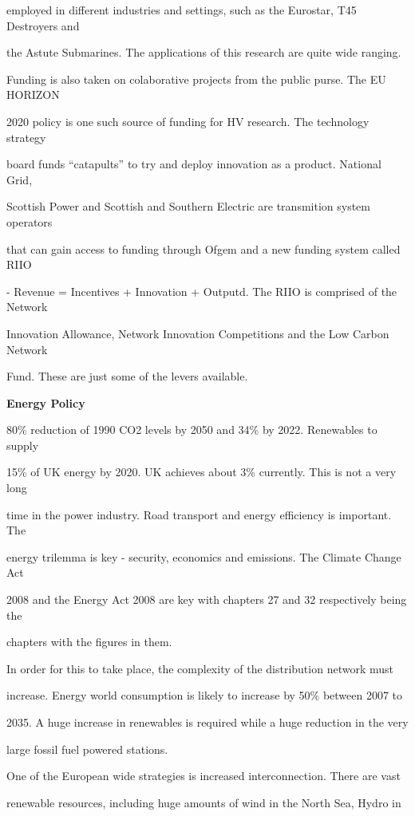employed in different industries and settings, such as the Eurostar, T45 Destroyers and 

the Astute Submarines. The applications of this research are quite wide ranging.

Funding is also taken on colaborative projects from the public purse. The EU HORIZON 

2020 policy is one such source of funding for HV research. The technology strategy 

board funds ``catapults'' to try and deploy innovation as a product. National Grid, 

Scottish Power and Scottish and Southern Electric are transmition system operators 

that can gain access to funding through Ofgem and a new funding system called RIIO 

- Revenue = Incentives + Innovation + Outputd. The RIIO is comprised of the Network 

Innovation Allowance, Network Innovation Competitions and the Low Carbon Network 

Fund. These are just some of the levers available.

\textbf{Energy Policy}

80\% reduction of 1990 CO2 levels by 2050 and 34\% by 2022. Renewables to supply 

15\% of UK energy by 2020. UK achieves about 3\% currently. This is not a very long 

time in the power industry. Road transport and energy efficiency is important. The 

energy trilemma is key - security, economics and emissions. The Climate Change Act 

2008 and the Energy Act 2008 are key with chapters 27 and 32 respectively being the 

chapters with the figures in them.

In order for this to take place, the complexity of the distribution network must 

increase. Energy world consumption is likely to increase by 50\% between 2007 to 

2035. A huge increase in renewables is required while a huge reduction in the very 

large fossil fuel powered stations.

One of the European wide strategies is increased interconnection. There are vast 

renewable resources, including huge amounts of wind in the North Sea, Hydro in 

